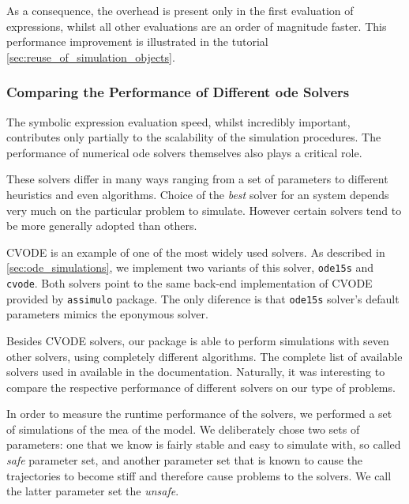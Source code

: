 As a consequence, the overhead is present only in the first evaluation of expressions, whilst all other evaluations are an order of magnitude faster.
This performance improvement is illustrated in the tutorial \autoref{sec:reuse_of_simulation_objects}.

\subsubsection{Comparing the Performance of Different \gls{ode} Solvers}

The symbolic expression evaluation speed, whilst incredibly important, contributes only partially to the scalability of the simulation procedures.
The performance of numerical \gls{ode} solvers themselves also plays a critical role.

These solvers differ in many ways ranging from a set of parameters to different heuristics and even algorithms.
Choice of the \emph{best} solver for an  system depends very much on the particular problem to simulate.
However certain solvers tend to be more generally adopted than others\cite{andersson_workbench_2012}.

CVODE\cite{hindmarsh_sundials_2005} is an example of one of the most widely used solvers.
As described in \autoref{sec:ode_simulations}, we implement two variants of this solver, \verb#ode15s# and \verb#cvode#.
Both solvers point to the same back-end implementation of CVODE provided by \verb#assimulo# package\cite{andersson_christian_assimulo:_????}.
The only diference is that \verb#ode15s# solver's default parameters mimics the eponymous \mat{} solver.

Besides CVODE solvers, our package is able to perform simulations with seven other solvers, using completely different algorithms.
The complete list of available solvers used in available in the documentation.
Naturally, it was interesting to compare the respective performance of different solvers on our type of problems.

In order to measure the runtime performance of the solvers, we performed a set of simulations of the \acrlong{mea} of the \pft{} model.
We deliberately chose two sets of parameters: one that we know is fairly stable and easy to simulate with, so called \emph{safe} parameter set,
and another parameter set that is known to cause the trajectories to become stiff and therefore cause problems to the solvers.
We call the latter parameter set the \emph{unsafe}.
 

